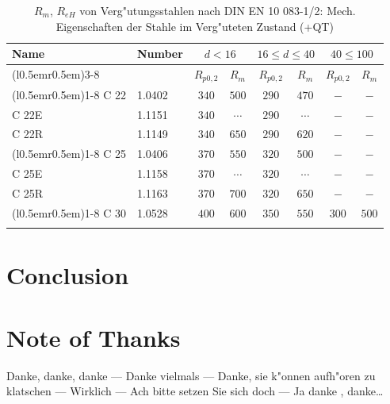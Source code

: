 \documentclass[article,colorback,accentcolor=tud4c]{tudreport}
\begin{document}
\begin{center}
  \begin{longtable}[h!]
    {ll@{\kern5em}c@{\kern1.1em}c@{\kern1.1em}
    c@{\kern1.1em}c@{\kern1.1em}c@{\kern1.1em}c}
    \toprule
    \multirow{2}{*}{Name}&\multirow{2}{*}{Number}
    &\multicolumn{2}{c}{$d < 16$}&\multicolumn{2}{c}{$16 \leq d \leq 40$}&
    \multicolumn{2}{c}{$40 \leq 100$}\\\cmidrule(l{0.5em}r{0.5em}){3-8}
    & &$R_{p0,2}$ &$R_m$ &$R_{p0,2}$ &$R_m$ &$R_{p0,2}$ &$R_m$\\
    \cmidrule(l{0.5em}r{0.5em}){1-8}
    \endhead
    C 22 &1.0402 &$340$ &$500$ &$290$ &$470$ &$-$ &$-$\\
    C 22E &1.1151 &$340$ &$\cdots$ &$290$ &$\cdots$ &$-$ &$-$\\
    C 22R &1.1149 &$340$ &$650$ &$290$ &$620$ &$-$ &$-$\\
    \cmidrule(l{0.5em}r{0.5em}){1-8}
    C 25 &1.0406 &$370$ &$550$ &$320$ &$500$ &$-$ &$-$\\
    C 25E &1.1158 &$370$ &$\cdots$ &$320$ &$\cdots$ &$-$ &$-$\\
    C 25R &1.1163 &$370$ &$700$ &$320$ &$650$ &$-$ &$-$\\
    \cmidrule(l{0.5em}r{0.5em}){1-8}
    C 30 &1.0528 &$400$ &$600$ &$350$ &$550$ &$300$ &$500$\\
    \bottomrule
    \caption{$R_m$, $R_{eH}$ von Verg"utungsstahlen nach DIN EN 10 083-1/2: Mech.
      Eigenschaften der Stahle im Verg"uteten Zustand (+QT)}
  \end{longtable}
\end{center}

\newpage

\section{Conclusion}
\setcounter{table}{0}
\setcounter{figure}{0}

\newpage

\section*{Note of Thanks}    \noindent
  Danke, danke, danke --- Danke vielmals --- Danke, sie k"onnen aufh"oren zu klatschen ---
  Wirklich --- Ach bitte setzen Sie sich doch --- Ja danke , danke\dots

\listoffigures{}
  
\end{document}
